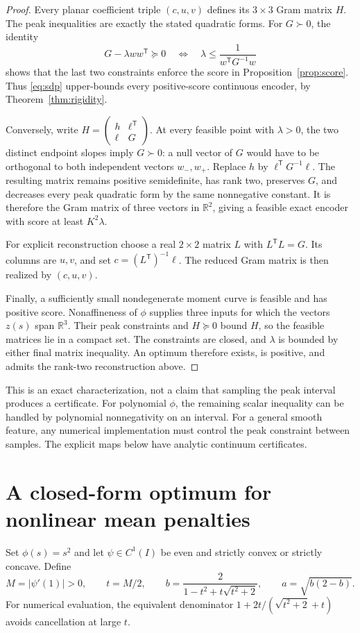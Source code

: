\documentclass[11pt,letterpaper]{article}
\theoremstyle{remark}
\newcommand{\R}{\mathbb R}
\newcommand{\T}{\mathsf T}
\newcommand{\suc}{\succeq}
\begin{document}
\begin{proof}
Every planar coefficient triple $(c,u,v)$ defines its $3\times3$ Gram matrix $H$. The peak inequalities are exactly the stated quadratic forms. For $G\succ0$, the identity
$$
 G-\lambda ww^\T\suc0
 \quad\Longleftrightarrow\quad
 \lambda\le\frac1{w^\T G^{-1}w}
$$
shows that the last two constraints enforce the score in Proposition~\ref{prop:score}. Thus \eqref{eq:sdp} upper-bounds every positive-score continuous encoder, by Theorem~\ref{thm:rigidity}.

Conversely, write $H=\left(\begin{smallmatrix}h&\ell^\T\\\ell&G\end{smallmatrix}\right)$. At every feasible point with $\lambda>0$, the two distinct endpoint slopes imply $G\succ0$: a null vector of $G$ would have to be orthogonal to both independent vectors $w_-,w_+$. Replace $h$ by $\ell^\T G^{-1}\ell$. The resulting matrix remains positive semidefinite, has rank two, preserves $G$, and decreases every peak quadratic form by the same nonnegative constant. It is therefore the Gram matrix of three vectors in $\R^2$, giving a feasible exact encoder with score at least $K^2\lambda$.

For explicit reconstruction choose a real $2\times2$ matrix $L$ with $L^{\T}L=G$. Its columns are $u,v$, and set $c=(L^\T)^{-1}\ell$. The reduced Gram matrix is then realized by $(c,u,v)$.

Finally, a sufficiently small nondegenerate moment curve is feasible and has positive score. Nonaffineness of $\phi$ supplies three inputs for which the vectors $z(s)$ span $\R^3$. Their peak constraints and $H\suc0$ bound $H$, so the feasible matrices lie in a compact set. The constraints are closed, and $\lambda$ is bounded by either final matrix inequality. An optimum therefore exists, is positive, and admits the rank-two reconstruction above.
\end{proof}

This is an exact characterization, not a claim that sampling the peak interval produces a certificate. For polynomial $\phi$, the remaining scalar inequality can be handled by polynomial nonnegativity on an interval. For a general smooth feature, any numerical implementation must control the peak constraint between samples. The explicit maps below have analytic continuum certificates.

\section{A closed-form optimum for nonlinear mean penalties}
Set $\phi(s)=s^2$ and let $\psi\in C^1(I)$ be even and strictly convex or strictly concave. Define
$$
 M=|\psi'(1)|>0,\qquad t=M/2,\qquad
 b=\frac{2}{1-t^2+t\sqrt{t^2+2}},\qquad a=\sqrt{b(2-b)}.
$$
For numerical evaluation, the equivalent denominator $1+2t/(\sqrt{t^2+2}+t)$ avoids cancellation at large $t$.
\end{document}
